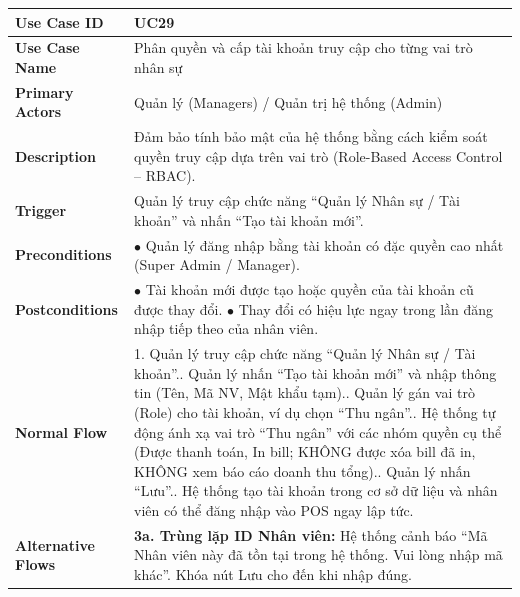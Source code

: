 \begin{longtable}{|L{3.5cm}|L{12.5cm}|}
\hline
\textbf{Use Case ID} & UC29 \\ \hline
\textbf{Use Case Name} & Phân quyền và cấp tài khoản truy cập cho từng vai trò nhân sự \\ \hline
\textbf{Primary Actors} & Quản lý (Managers) / Quản trị hệ thống (Admin) \\ \hline
\textbf{Description} & Đảm bảo tính bảo mật của hệ thống bằng cách kiểm soát quyền truy cập dựa trên vai trò (Role-Based Access Control -- RBAC). \\ \hline
\textbf{Trigger} & Quản lý truy cập chức năng ``Quản lý Nhân sự / Tài khoản'' và nhấn ``Tạo tài khoản mới''. \\ \hline
\textbf{Preconditions} & $\bullet$ Quản lý đăng nhập bằng tài khoản có đặc quyền cao nhất (Super Admin / Manager). \\ \hline
\textbf{Postconditions} &
$\bullet$ Tài khoản mới được tạo hoặc quyền của tài khoản cũ được thay đổi.\newline
$\bullet$ Thay đổi có hiệu lực ngay trong lần đăng nhập tiếp theo của nhân viên. \\ \hline
\textbf{Normal Flow} &
1. Quản lý truy cập chức năng ``Quản lý Nhân sự / Tài khoản''.. Quản lý nhấn ``Tạo tài khoản mới'' và nhập thông tin (Tên, Mã NV, Mật khẩu tạm).. Quản lý gán vai trò (Role) cho tài khoản, ví dụ chọn ``Thu ngân''.. Hệ thống tự động ánh xạ vai trò ``Thu ngân'' với các nhóm quyền cụ thể (Được thanh toán, In bill; KHÔNG được xóa bill đã in, KHÔNG xem báo cáo doanh thu tổng).. Quản lý nhấn ``Lưu''.. Hệ thống tạo tài khoản trong cơ sở dữ liệu và nhân viên có thể đăng nhập vào POS ngay lập tức. \\ \hline
\textbf{Alternative Flows} &
\textbf{3a. Trùng lặp ID Nhân viên:} Hệ thống cảnh báo ``Mã Nhân viên này đã tồn tại trong hệ thống. Vui lòng nhập mã khác''. Khóa nút Lưu cho đến khi nhập đúng. \\ \hline
\end{longtable}

